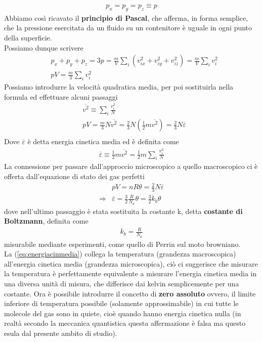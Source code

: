 \documentclass[
10pt, %
a4paper, %
oneside, %
headinclude,footinclude, %
BCOR5mm, %
]{scrartcl}
\begin{document}
\begin{align*} 
	p_x = p_y = p_z \equiv p
\end{align*} 
Abbiamo così ricavato il \textbf{principio di Pascal}, che afferma, in forma semplice, che la pressione esercitata da un fluido su un contenitore è uguale in ogni punto della superficie.\\
Possiamo dunque scrivere
\begin{align*} 
	&p_x+p_y+p_z = 3p = \frac{m}{V} \sum_i (v_{ix}^2+v_{iy}^2+v_{iz}^2) = \frac{m}{V} \sum_i v_i^2\\
	&pV = \frac{m}{3}\sum_i v_i^2
\end{align*} 
Possiamo introdurre la velocità quadratica media, per poi sostituirla nella formula ed effettuare alcuni passaggi
\begin{align*} 
	&\overline{v^2} \equiv \sum_i\frac{v_i^2}{N}\\
	&pV = \frac{m}{3}N \overline{v^2} = \frac{2}{3} N (\frac{1}{2}m \overline{v^2})=\frac{2}{3}N \overline{\varepsilon}\\
\end{align*} 
Dove $\overline{\varepsilon}$ è detta energia cinetica media ed è definita come
\begin{align*} 
	\overline{\varepsilon} \equiv \frac{1}{2} m \overline{v^2} = \frac{1}{2} m \sum_i\frac{v_i^2}{N}
\end{align*} 
La connessione per passare dall'approccio microscopico a quello macroscopico ci è offerta dall'equazione di stato dei gas perfetti
\begin{align}\label{eq:energiacinmedia}
	&pV = n R \theta = \frac{2}{3}N \overline{\varepsilon}\nonumber\\
	\Rightarrow & \overline{\varepsilon} = \frac{3}{2} \frac{R}{N_a} \theta = \frac{3}{2}k_b\theta
\end{align} 
dove nell'ultimo passaggio è stata sostituita la costante k, detta \textbf{costante di Boltzmann}, definita come
\begin{align*} 
	k_b = \frac{R}{N_a}
\end{align*} 
misurabile mediante esperimenti, come quello di Perrin sul moto browniano.\\ 
La (\ref{eq:energiacinmedia}) collega la temperatura (grandezza macroscopica) all'energia cinetica media (grandezza microscopica), ciò ci suggerisce che misurare la temperatura è perfettamente equivalente a misurare l'energia cinetica media in una diversa unità di misura, che differisce dai kelvin semplicemente per una costante. Ora è possibile introdurre il concetto di \textbf{zero assoluto} ovvero, il limite inferiore di temperatura possibile (solamente approssimabile) in cui tutte le molecole del gas sono in quiete, cioè quando hanno energia cinetica nulla (in realtà secondo la meccanica quantistica questa affermazione è falsa ma questo esula dal presente ambito di studio).
\end{document}
